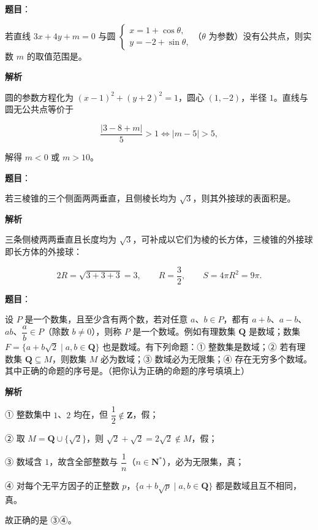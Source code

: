 \begin{answer}

\textbf{题目}：

若直线 $3x+4y+m=0$ 与圆 $\begin{cases}x=1+\cos\theta,\\ y=-2+\sin\theta,\end{cases}$（$\theta$ 为参数）没有公共点，则实数 $m$ 的取值范围是\gkblank{}。

\textbf{解析}

圆的参数方程化为 $(x-1)^2+(y+2)^2=1$，圆心 $(1,-2)$，半径 $1$。直线与圆无公共点等价于

\nopagebreak[4]
\[\frac{|3-8+m|}5>1\iff |m-5|>5,\]

解得 $m<0$ 或 $m>10$。


\end{answer}
\begin{answer}

\textbf{题目}：

若三棱锥的三个侧面两两垂直，且侧棱长均为 $\sqrt3$，则其外接球的表面积是\gkblank{}。

\textbf{解析}

三条侧棱两两垂直且长度均为 $\sqrt3$，可补成以它们为棱的长方体，三棱锥的外接球即长方体的外接球：

\nopagebreak[4]
\[2R=\sqrt{3+3+3}=3,\qquad R=\frac32,\qquad S=4\pi R^2=9\pi.\]


\end{answer}
\begin{answer}

\textbf{题目}：

设 $P$ 是一个数集，且至少含有两个数，若对任意 $a$、$b\in P$，都有 $a+b$、$a-b$、$ab$、$\dfrac ab\in P$（除数 $b\neq0$），则称 $P$ 是一个数域。例如有理数集 $\mathbf Q$ 是数域；数集 $F=\{a+b\sqrt2\mid a,b\in\mathbf Q\}$ 也是数域。有下列命题：① 整数集是数域；② 若有理数集 $\mathbf Q\subseteq M$，则数集 $M$ 必为数域；③ 数域必为无限集；④ 存在无穷多个数域。其中正确的命题的序号是\gkblank{}。（把你认为正确的命题的序号填填上）

\textbf{解析}

① 整数集中 $1$、$2$ 均在，但 $\dfrac12\notin\mathbf Z$，假；

② 取 $M=\mathbf Q\cup\{\sqrt2\}$，则 $\sqrt2+\sqrt2=2\sqrt2\notin M$，假；

③ 数域含 $1$，故含全部整数与 $\dfrac1n$（$n\in\mathbf N^*$），必为无限集，真；

④ 对每个无平方因子的正整数 $p$，$\{a+b\sqrt p\mid a,b\in\mathbf Q\}$ 都是数域且互不相同，真。

故正确的是 ③④。


\end{answer}
